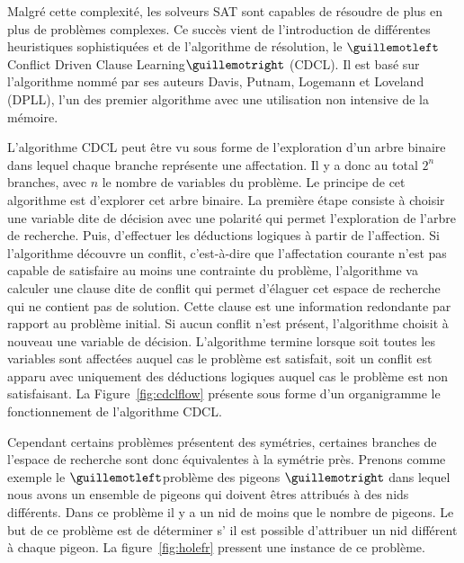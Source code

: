Malgré cette complexité, les solveurs SAT sont capables de résoudre de plus en plus de problèmes complexes.
Ce succès vient de l'introduction de différentes heuristiques sophistiquées et de 
l'algorithme de résolution, le $\guillemotleft$ Conflict Driven Clause Learning$\guillemotright$ (CDCL).
Il est basé sur l'algorithme nommé par ses auteurs Davis, Putnam, Logemann et Loveland (DPLL)\cite{dpll_62},
l'un des premier algorithme avec une utilisation non intensive de la mémoire.

%
%
%


L'algorithme CDCL peut être vu sous forme de l'exploration d'un arbre binaire dans lequel  chaque branche représente 
une affectation. Il y a donc au total $2^n$ branches, avec $n$ le nombre de variables du problème.
Le principe de cet algorithme est d'explorer cet arbre binaire. 
La première étape consiste à choisir une variable dite de décision avec une polarité qui permet l'exploration
de l'arbre de recherche. Puis, d'effectuer les déductions logiques à partir de l'affection. 
Si l'algorithme découvre un conflit, c'est-à-dire que l'affectation courante n'est pas capable de satisfaire au moins une contrainte du problème, l'algorithme va calculer une clause dite de conflit qui permet d'élaguer 
cet espace de recherche qui ne contient pas de solution. Cette clause est une information redondante par
rapport au problème initial. Si aucun conflit n'est présent, l'algorithme choisit à nouveau une variable de décision. L'algorithme termine lorsque soit toutes les variables sont affectées auquel cas le problème 
est satisfait, soit un conflit est apparu avec uniquement des déductions logiques auquel cas le
problème est non satisfaisant.
La Figure~\ref{fig:cdclflow} présente sous forme d'un organigramme le fonctionnement de l'algorithme CDCL.



Cependant certains problèmes présentent des symétries, certaines branches de l'espace de recherche 
sont donc équivalentes à la symétrie près. Prenons comme exemple le $\guillemotleft$problème des pigeons $\guillemotright$ dans lequel nous avons un ensemble de pigeons qui doivent êtres attribués à des nids différents. Dans ce problème il y a un nid de moins que le nombre de pigeons.
Le but de ce problème est de déterminer s’ il est possible d'attribuer un nid différent à chaque pigeon.
 La figure~\ref{fig:holefr} pressent une instance de ce problème.
 
